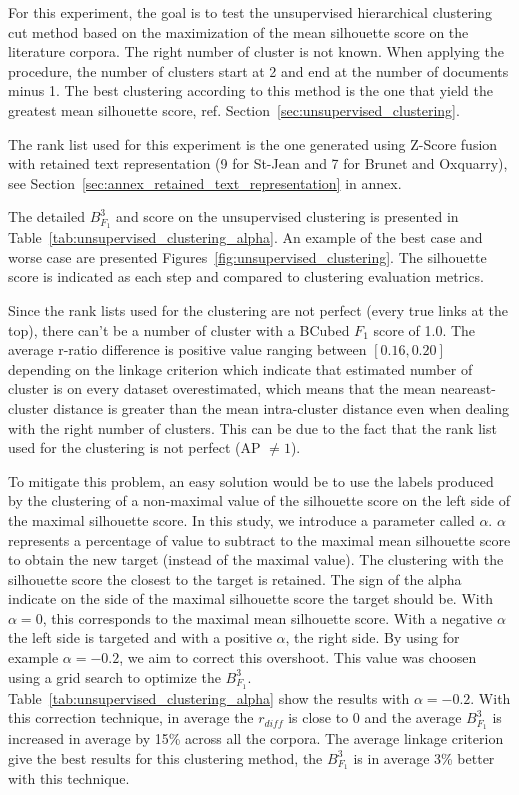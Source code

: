 For this experiment, the goal is to test the unsupervised hierarchical clustering cut method based on the maximization of the mean silhouette score on the literature corpora.
The right number of cluster is not known.
When applying the procedure, the number of clusters start at 2 and end at the number of documents minus 1.
The best clustering according to this method is the one that yield the greatest mean silhouette score, ref. Section~\ref{sec:unsupervised_clustering}.

The rank list used for this experiment is the one generated using Z-Score fusion with retained text representation (9 for St-Jean and 7 for Brunet and Oxquarry), see Section~\ref{sec:annex_retained_text_representation} in annex.

The detailed $B^3_{F_1}$ and score on the unsupervised clustering is presented in Table~\ref{tab:unsupervised_clustering_alpha}.
An example of the best case and worse case are presented Figures~\ref{fig:unsupervised_clustering}.
The silhouette score is indicated as each step and compared to clustering evaluation metrics.

Since the rank lists used for the clustering are not perfect (every true links at the top), there can't be a number of cluster with a BCubed $F_1$ score of 1.0.
The average r-ratio difference is positive value ranging between $\left[0.16, 0.20\right]$ depending on the linkage criterion which indicate that estimated number of cluster is on every dataset overestimated, which means that the mean neareast-cluster distance is greater than the mean intra-cluster distance even when dealing with the right number of clusters.
This can be due to the fact that the rank list used for the clustering is not perfect (AP $\neq 1$).

To mitigate this problem, an easy solution would be to use the labels produced by the clustering of a non-maximal value of the silhouette score on the left side of the maximal silhouette score.
In this study, we introduce a parameter called $\alpha$.
$\alpha$ represents a percentage of value to subtract to the maximal mean silhouette score to obtain the new target (instead of the maximal value).
The clustering with the silhouette score the closest to the target is retained.
The sign of the alpha indicate on the side of the maximal silhouette score the target should be.
With $\alpha = 0$, this corresponds to the maximal mean silhouette score.
With a negative $\alpha$ the left side is targeted and with a positive $\alpha$, the right side.
By using for example $\alpha = -0.2$, we aim to correct this overshoot.
This value was choosen using a grid search to optimize the $B^3_{F_1}$.
Table~\ref{tab:unsupervised_clustering_alpha} show the results with $\alpha = -0.2$.
With this correction technique, in average the $r_{diff}$ is close to 0 and the average $B^3_{F_1}$ is increased in average by 15\% across all the corpora.
The average linkage criterion give the best results for this clustering method, the $B^3_{F_1}$ is in average 3\% better with this technique.

